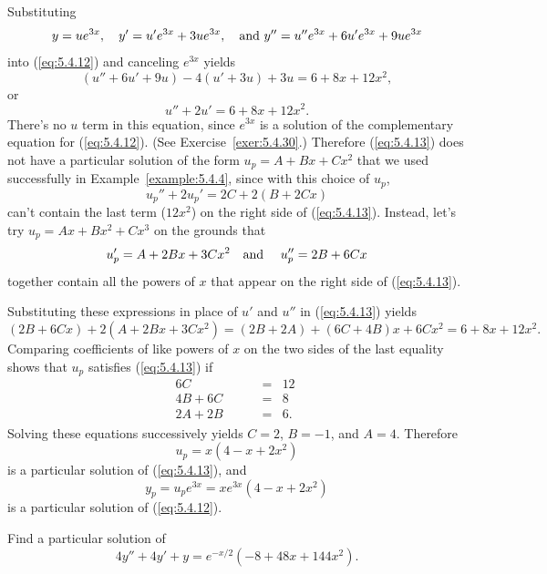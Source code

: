 \begin{examplesolution}
\solution Substituting
\[
  y=ue^{3x},\quad y'=u'e^{3x}+3ue^{3x},\mbox{\quad and }y''=u''e^{3x}+6u'e^{3x}+9ue^{3x}
\]
into (\ref{eq:5.4.12}) and canceling $e^{3x}$ yields
\[
  (u''+6u'+9u)-4(u'+3u)+3u=6+8x+12x^{2},
\]
or
\begin{equation}
  \label{eq:5.4.13}u''+2u'=6+8x+12x^{2}.
\end{equation}
There's no $u$ term in this equation, since $e^{3x}$ is a solution of the complementary equation for
(\ref{eq:5.4.12}). (See Exercise~\ref{exer:5.4.30}.) Therefore (\ref{eq:5.4.13}) does not have a
particular solution of the form $u_{p}=A+Bx+Cx^{2}$ that we used successfully in
Example~\ref{example:5.4.4}, since with this choice of $u_{p}$,
\[
  u_{p}''+2u_{p}'=2C+2(B+2Cx)
\]
can't contain the last term ($12x^{2}$) on the right side of (\ref{eq:5.4.13}). Instead, let's try
$u_{p}=Ax+Bx^{2}+Cx^{3}$ on the grounds that
\[
  u_{p}'=A+2Bx+3Cx^{2}\mbox{\quad and \quad}u_{p}''=2B+6Cx
\]
together contain all the powers of $x$ that appear on the right side of (\ref{eq:5.4.13}).

Substituting these expressions in place of $u'$ and $u''$ in (\ref{eq:5.4.13}) yields
\[
  (2B+6Cx)+2(A+2Bx+3Cx^{2})=(2B+2A)+(6C+4B)x+6Cx^{2}=6+8x+12x^{2}.
\]
Comparing coefficients of like powers of $x$ on the two sides of the last equality shows that
$u_{p}$ satisfies (\ref{eq:5.4.13}) if
\[
  \begin{array}{rcr}
    6C                     & = & 12\phantom{.} \\
    4B+6C                  & = & 8\phantom{.}  \\
    2A+2B\phantom{+6u_{2}} & = & 6.
  \end{array}
\]
Solving these equations successively yields $C=2$, $B=-1$, and $A=4$. Therefore
\[
  u_{p}=x(4-x+2x^{2})
\]
is a particular solution of (\ref{eq:5.4.13}), and
\[
  y_{p}=u_{p}e^{3x}=xe^{3x}(4-x+2x^{2})
\]
is a particular solution of (\ref{eq:5.4.12}).
\end{examplesolution}

\begin{example}
  \label{example:5.4.6} \rm Find a particular solution of
  \begin{equation}
    \label{eq:5.4.14}4y''+4y'+y=e^{-x/2}(-8+48x+144x^{2}).
  \end{equation}
\end{example}

